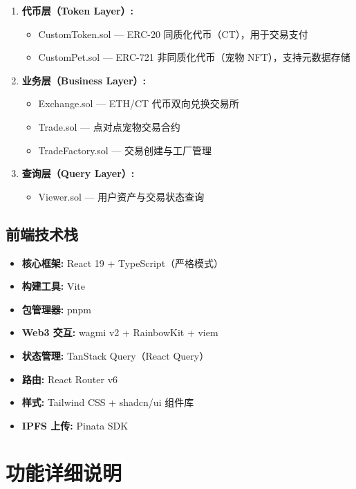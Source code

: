\documentclass{mancls}
\begin{document}
\begin{enumerate}
	\item \textbf{代币层（Token Layer）:}
	      \begin{itemize}
		      \item CustomToken.sol — ERC-20 同质化代币（CT），用于交易支付
		      \item CustomPet.sol — ERC-721 非同质化代币（宠物 NFT），支持元数据存储
	      \end{itemize}
	\item \textbf{业务层（Business Layer）:}
	      \begin{itemize}
		      \item Exchange.sol — ETH/CT 代币双向兑换交易所
		      \item Trade.sol — 点对点宠物交易合约
		      \item TradeFactory.sol — 交易创建与工厂管理
	      \end{itemize}
	\item \textbf{查询层（Query Layer）:}
	      \begin{itemize}
		      \item Viewer.sol — 用户资产与交易状态查询
	      \end{itemize}
\end{enumerate}

\subsection{前端技术栈}

\begin{itemize}
	\item \textbf{核心框架:} React 19 + TypeScript（严格模式）
	\item \textbf{构建工具:} Vite
	\item \textbf{包管理器:} pnpm
	\item \textbf{Web3 交互:} wagmi v2 + RainbowKit + viem
	\item \textbf{状态管理:} TanStack Query（React Query）
	\item \textbf{路由:} React Router v6
	\item \textbf{样式:} Tailwind CSS + shadcn/ui 组件库
	\item \textbf{IPFS 上传:} Pinata SDK
\end{itemize}

\section{功能详细说明}
\end{document}
